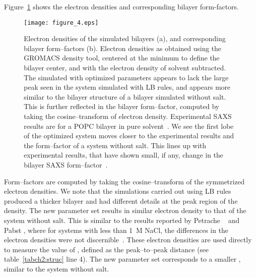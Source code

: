 Figure~\ref{figch2:eldens} shows the electron densities and corresponding bilayer form-factors.
\begin{figure}[h!tb]
    \caption[Electron densities of the simulated bilayers]{Electron densities of the simulated bilayers (a), and corresponding bilayer form--factors (b).
        Electron densities as obtained using the GROMACS density tool,
    centered at the minimum to define the bilayer center, and with the electron density of solvent subtracted.
    The simulated with optimized parameters appears to lack the large peak seen in the system simulated
    with LB rules, and appears more similar to the
bilayer structure of a bilayer simulated without salt. 
This is further reflected in the bilayer form--factor, 
computed by taking the cosine--transform of electron density. Experimental
SAXS results are for a POPC bilayer in pure solvent~\cite{fogarty:2015}. We see the first lobe
of the optimized system moves closer to the experimental results and the form--factor of a system without salt. This lines up with experimental results, that have shown small, if any, change
in the bilayer SAXS form--factor~\cite{pabst:2007,petrache:2006:swelling,uhrikova:2008}.}
    \label{figch2:eldens}
    \texttt{[image: figure\_4.eps]}
\end{figure}
Form--factors are computed by taking the cosine--transform of the symmetrized electron densities.   
We note that the simulations carried out using LB rules produced a
thicker bilayer and had different details at the peak region of the density. 
The new parameter set results in similar electron density to that of the system without salt.
This is similar to the results reported by Petrache
\etal~ and Pabst \etal, where for systems with less than 1~M NaCl, 
the differences in the electron densities were not
discernible~\cite{petrache:2006:swelling,pabst:2007}. 
These electron densities are used directly to measure the value of \dhh, 
defined as the peak--to--peak distance (see table~\ref{tabch2:struc} line 4). 
The new parameter set corresponds to a smaller \dhh, similar to the system without salt.

